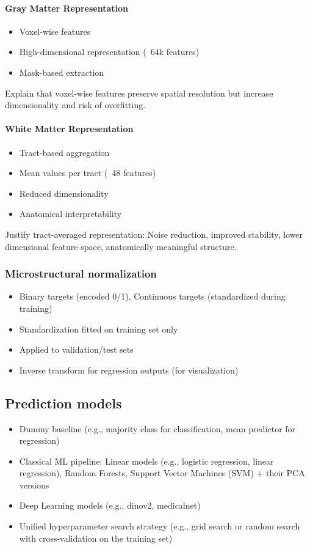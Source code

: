\paragraph{Gray Matter Representation}
\begin{itemize}
    \item Voxel-wise features
    \item High-dimensional representation (~64k features)
    \item Mask-based extraction
\end{itemize}
Explain that voxel-wise features preserve spatial resolution but increase dimensionality and risk of overfitting.

\paragraph{White Matter Representation}
\begin{itemize}
    \item Tract-based aggregation
    \item Mean values per tract (~48 features)
    \item Reduced dimensionality
    \item Anatomical interpretability
\end{itemize}
Justify tract-averaged representation: Noise reduction, improved stability, lower dimensional feature space, anatomically meaningful structure.

\subsubsection{Microstructural normalization}
    \begin{itemize}
        \item Binary targets (encoded 0/1), Continuous targets (standardized during training)
        \item Standardization fitted on training set only
        \item Applied to validation/test sets 
        \item Inverse transform for regression outputs (for visualization)
    \end{itemize}

\subsection{Prediction models}
    \begin{itemize}
        \item Dummy baseline (e.g., majority class for classification, mean predictor for regression)
        \item Classical ML pipeline: Linear models (e.g., logistic regression, linear regression), Random Forests, Support Vector Machines (SVM) + their PCA versions
        \item Deep Learning models (e.g., dinov2, medicalnet)
        \item Unified hyperparameter search strategy (e.g., grid search or random search with cross-validation on the training set)
\end{itemize}

